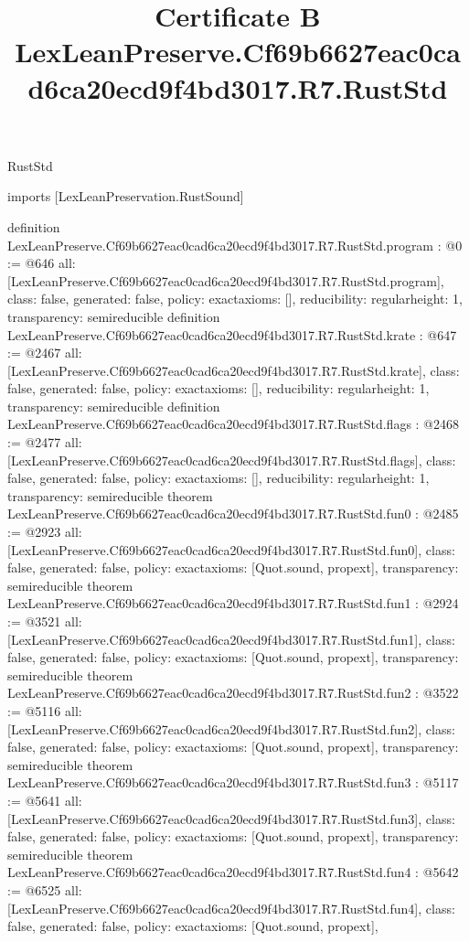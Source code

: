\begin{lexlean}{RustStd}
\title{Certificate B LexLeanPreserve.Cf69b6627eac0cad6ca20ecd9f4bd3017.R7.RustStd}
\begin{coremodule}
imports [LexLeanPreservation.RustSound]

definition LexLeanPreserve.Cf69b6627eac0cad6ca20ecd9f4bd3017.R7.RustStd.program : @0 := @646 {
  all: [LexLeanPreserve.Cf69b6627eac0cad6ca20ecd9f4bd3017.R7.RustStd.program],
  class: false,
  generated: false,
  policy: exact{axioms: []},
  reducibility: regular{height: 1},
  transparency: semireducible
}
definition LexLeanPreserve.Cf69b6627eac0cad6ca20ecd9f4bd3017.R7.RustStd.krate : @647 := @2467 {
  all: [LexLeanPreserve.Cf69b6627eac0cad6ca20ecd9f4bd3017.R7.RustStd.krate],
  class: false,
  generated: false,
  policy: exact{axioms: []},
  reducibility: regular{height: 1},
  transparency: semireducible
}
definition LexLeanPreserve.Cf69b6627eac0cad6ca20ecd9f4bd3017.R7.RustStd.flags : @2468 := @2477 {
  all: [LexLeanPreserve.Cf69b6627eac0cad6ca20ecd9f4bd3017.R7.RustStd.flags],
  class: false,
  generated: false,
  policy: exact{axioms: []},
  reducibility: regular{height: 1},
  transparency: semireducible
}
theorem LexLeanPreserve.Cf69b6627eac0cad6ca20ecd9f4bd3017.R7.RustStd.fun0 : @2485 := @2923 {
  all: [LexLeanPreserve.Cf69b6627eac0cad6ca20ecd9f4bd3017.R7.RustStd.fun0],
  class: false,
  generated: false,
  policy: exact{axioms: [Quot.sound, propext]},
  transparency: semireducible
}
theorem LexLeanPreserve.Cf69b6627eac0cad6ca20ecd9f4bd3017.R7.RustStd.fun1 : @2924 := @3521 {
  all: [LexLeanPreserve.Cf69b6627eac0cad6ca20ecd9f4bd3017.R7.RustStd.fun1],
  class: false,
  generated: false,
  policy: exact{axioms: [Quot.sound, propext]},
  transparency: semireducible
}
theorem LexLeanPreserve.Cf69b6627eac0cad6ca20ecd9f4bd3017.R7.RustStd.fun2 : @3522 := @5116 {
  all: [LexLeanPreserve.Cf69b6627eac0cad6ca20ecd9f4bd3017.R7.RustStd.fun2],
  class: false,
  generated: false,
  policy: exact{axioms: [Quot.sound, propext]},
  transparency: semireducible
}
theorem LexLeanPreserve.Cf69b6627eac0cad6ca20ecd9f4bd3017.R7.RustStd.fun3 : @5117 := @5641 {
  all: [LexLeanPreserve.Cf69b6627eac0cad6ca20ecd9f4bd3017.R7.RustStd.fun3],
  class: false,
  generated: false,
  policy: exact{axioms: [Quot.sound, propext]},
  transparency: semireducible
}
theorem LexLeanPreserve.Cf69b6627eac0cad6ca20ecd9f4bd3017.R7.RustStd.fun4 : @5642 := @6525 {
  all: [LexLeanPreserve.Cf69b6627eac0cad6ca20ecd9f4bd3017.R7.RustStd.fun4],
  class: false,
  generated: false,
  policy: exact{axioms: [Quot.sound, propext]},
}
\end{coremodule}
\end{lexlean}
